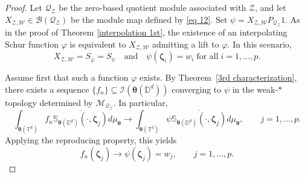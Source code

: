 \documentclass[12pt,reqno]{amsart}
\theoremstyle{remark}
\theoremstyle{definition}
\begin{document}
\begin{proof}
Let $\mathcal{Q}_{\mathcal{Z}}$ be the zero-based quotient module associated with $\mathcal{Z}$, and let $X_{\mathcal{Z,W}}\in \mathcal{B}(\mathcal{Q}_{\mathcal{Z}})$ be the module map defined by \eqref{eq 12}. Set $\psi=X_{\mathcal{Z,W}}P_{\mathcal{Q}_{\mathcal{Z}}}1.$ As in the proof of Theorem \ref{interpolation 1st}, the existence of an interpolating Schur function $\varphi$ is equivalent to $X_{\mathcal{Z,W}}$ admitting a lift to $\varphi.$ 
In this scenario, $$X_{\mathcal{Z,W}}=S_{\varphi}=S_{\psi} \quad\text{and}\quad \psi(\boldsymbol \zeta_i)=w_i \;\text{for all}\; i=1,\ldots,p.$$

Assume first that such a function $\varphi$ exists. By Theorem~\ref{3rd characterization}, there exists a sequence $\{f_n\}\subseteq \mathcal{I}(\boldsymbol \theta(\mathbb D^d))$ converging to $\psi$ in the weak-$*$ topology determined by $\mathcal{M}_{\mathcal{Q}_{\mathcal{Z}}}$.
In particular, $$\int_{\boldsymbol \theta(\mathbb T^d)} f_n \overline{\mathbb S_{\boldsymbol \theta(\mathbb D^d)}(\cdot, \boldsymbol \zeta_j)} d\mu_{\boldsymbol \theta} \to \int_{\boldsymbol \theta(\mathbb T^d)} \psi \overline{\mathbb S_{\boldsymbol \theta(\mathbb D^d)}(\cdot, \boldsymbol \zeta_j)} d\mu_{\boldsymbol \theta}, \qquad j=1,\ldots, p.$$
Applying the reproducing property, this yields
$$f_n(\boldsymbol \zeta_j)\to \psi(\boldsymbol \zeta_j)=w_j, \qquad j=1,\ldots,p.$$


\end{proof}
\end{document}
